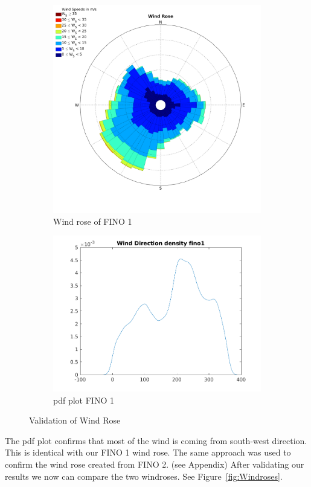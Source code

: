 \documentclass[10pt]{article}
\begin{document}
\begin{figure}[htb!]

\begin{subfigure}{0.42\textwidth}
  \centering
  \includegraphics[width=1\linewidth]{../figures/WindRose_Fino1.png}
  \caption{Wind rose of FINO 1}
\end{subfigure}
\begin{subfigure}{0.58\textwidth}
  \centering
  \includegraphics[width=1\linewidth]{../figures/Validation_WindRose_Fino1.png}
  \caption{pdf plot FINO 1}
\end{subfigure}
  \caption{Validation of Wind Rose}
\label{fig:WindroseValidation}
\end{figure}
\newpage
The pdf plot confirms that most of the wind is coming from south-west direction. This is identical with our FINO 1 wind rose. The same approach was used to confirm the wind rose created from FINO 2. (see Appendix)
After validating our results we now can compare the two windroses. See Figure~\ref{fig:Windroses}.
\end{document}
